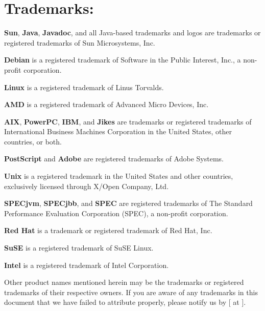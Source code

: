 \section*{Trademarks:}
\label{trademarks}

{\bf Sun}, {\bf Java}, {\bf Javadoc}, and all Java-based trademarks
and logos are trademarks or registered trademarks of Sun Microsystems,
Inc. 

{\bf Debian} is a registered trademark of Software in the Public
Interest, Inc.\@, a non-profit corporation.

{\bf Linux} is a registered trademark of Linus Torvalds.

{\bf AMD} is a registered trademark of Advanced Micro Devices, Inc.

{\bf AIX}, {\bf PowerPC}, {\bf IBM}, and {\bf Jikes} are
trademarks or 
registered trademarks of International Business Machines Corporation in the
United States, other countries, or both.

{\bf PostScript} and {\bf Adobe} are registered trademarks of Adobe Systems.

{\bf Unix} is a registered trademark in the United States and other
countries, exclusively licensed through X/Open Company, Ltd.

{\bf SPECjvm}, {\bf SPECjbb}, and {\bf SPEC} are registered
trademarks of The Standard Performance Evaluation Corporation (SPEC),
a non-profit corporation. 

{\bf Red Hat} is a trademark or registered trademark of Red Hat, Inc.

{\bf SuSE} is a registered trademark of SuSE Linux.

{\bf Intel} is a registered trademark of Intel Corporation.

Other product names mentioned herein may be the trademarks or
registered trademarks of their respective owners.  If you are aware of
any trademarks in this document that we have failed to attribute
properly, please notify us by [ at {\tt \RVMBugURL}]{\RVMBugURL}.

